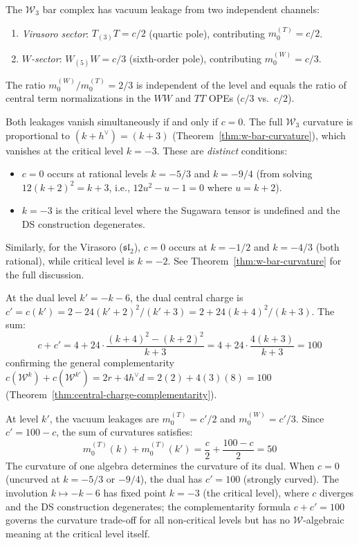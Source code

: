 \begin{computation}\label{comp:w3-curvature-dual-detail}
The $\mathcal{W}_3$ bar complex has vacuum leakage from two independent channels:
\begin{enumerate}
\item \emph{Virasoro sector}: $T_{(3)}T = c/2$ (quartic pole), contributing $m_0^{(T)} = c/2$.
\item \emph{$W$-sector}: $W_{(5)}W = c/3$ (sixth-order pole), contributing $m_0^{(W)} = c/3$.
\end{enumerate}
The ratio $m_0^{(W)}/m_0^{(T)} = 2/3$ is independent of the level and equals the
ratio of central term normalizations in the $WW$ and $TT$ OPEs
($c/3$ vs.\ $c/2$).

Both leakages vanish simultaneously if and only if $c = 0$.
The full $\mathcal{W}_3$ curvature is proportional to $(k + h^\vee) = (k+3)$
(Theorem~\ref{thm:w-bar-curvature}), which vanishes at the critical level
$k = -3$.  These are \emph{distinct} conditions:
\begin{itemize}
\item $c = 0$ occurs at rational levels $k = -5/3$ and $k = -9/4$
  (from solving $12(k+2)^2 = k+3$, i.e., $12u^2 - u - 1 = 0$ where $u = k+2$).
\item $k = -3$ is the critical level where the Sugawara tensor is undefined and
  the DS construction degenerates.
\end{itemize}
Similarly, for the Virasoro ($\mathfrak{sl}_2$), $c = 0$ occurs at
$k = -1/2$ and $k = -4/3$ (both rational), while critical level is $k = -2$.
See Theorem~\ref{thm:w-bar-curvature} for the full discussion.

At the dual level $k' = -k-6$, the dual central charge is $c' = c(k') = 2 - 24(k'+2)^2/(k'+3) = 2 + 24(k+4)^2/(k+3)$.
The sum:
\[
c + c' = 4 + 24\cdot\frac{(k+4)^2 - (k+2)^2}{k+3}
       = 4 + 24\cdot\frac{4(k+3)}{k+3} = 100
\]
confirming the general complementarity $c(\mathcal{W}^k) + c(\mathcal{W}^{k'})
= 2r + 4h^\vee d = 2(2) + 4(3)(8) = 100$
(Theorem~\ref{thm:central-charge-complementarity}).

At level $k'$, the vacuum leakages are $m_0^{(T)} = c'/2$ and $m_0^{(W)} = c'/3$.
Since $c' = 100 - c$, the sum of curvatures satisfies:
\[
m_0^{(T)}(k) + m_0^{(T)}(k') = \frac{c}{2} + \frac{100-c}{2} = 50
\]
The curvature of one algebra determines the curvature of its dual.  When
$c = 0$ (uncurved at $k = -5/3$ or $-9/4$), the dual has $c' = 100$
(strongly curved).  The involution $k \mapsto -k-6$ has fixed point $k = -3$
(the critical level), where $c$ diverges and the DS construction degenerates;
the complementarity formula $c + c' = 100$ governs the curvature trade-off
for all non-critical levels but has no $\mathcal{W}$-algebraic meaning at
the critical level itself.


\end{computation}
